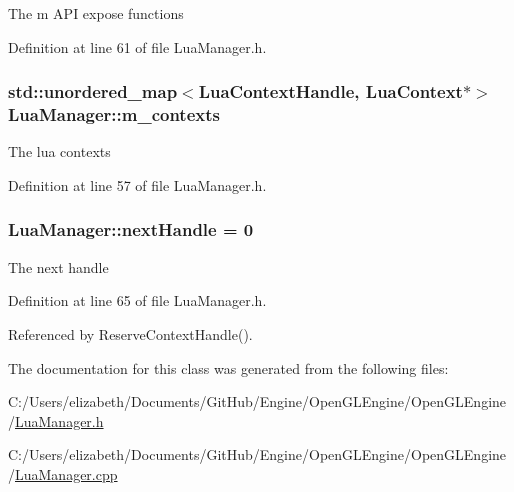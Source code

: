 The m A\+PI expose functions 



Definition at line 61 of file Lua\+Manager.\+h.

\subsubsection[{\texorpdfstring{m\+\_\+contexts}{m_contexts}}]{\setlength{\rightskip}{0pt plus 5cm}std\+::unordered\+\_\+map$<${\bf Lua\+Context\+Handle}, {\bf Lua\+Context}$\ast$$>$ Lua\+Manager\+::m\+\_\+contexts\hspace{0.3cm}{\ttfamily [private]}}\hypertarget{class_lua_manager_a38776ab77e2724c0ea549be44087ab98}{}\label{class_lua_manager_a38776ab77e2724c0ea549be44087ab98}


The lua contexts 



Definition at line 57 of file Lua\+Manager.\+h.

\subsubsection[{\texorpdfstring{next\+Handle}{nextHandle}}]{ Lua\+Manager\+::next\+Handle = 0\hspace{0.3cm}{\ttfamily [private]}}\hypertarget{class_lua_manager_a62ecf686a07cbe20f7976e9b29ea4daa}{}\label{class_lua_manager_a62ecf686a07cbe20f7976e9b29ea4daa}


The next handle 



Definition at line 65 of file Lua\+Manager.\+h.



Referenced by Reserve\+Context\+Handle().



The documentation for this class was generated from the following files\+:\begin{DoxyCompactItemize}
\item 
C\+:/\+Users/elizabeth/\+Documents/\+Git\+Hub/\+Engine/\+Open\+G\+L\+Engine/\+Open\+G\+L\+Engine/\hyperlink{_lua_manager_8h}{Lua\+Manager.\+h}\item 
C\+:/\+Users/elizabeth/\+Documents/\+Git\+Hub/\+Engine/\+Open\+G\+L\+Engine/\+Open\+G\+L\+Engine/\hyperlink{_lua_manager_8cpp}{Lua\+Manager.\+cpp}\end{DoxyCompactItemize}
